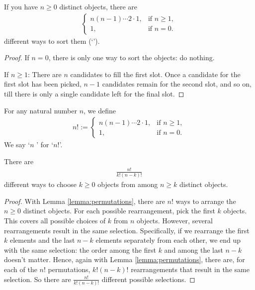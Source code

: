 \label{lemma:permutations}
  If you have $n \geq 0$ distinct objects,
  there are 
  \begin{align*}
    \begin{cases}
      n(n-1)\cdots 2 \cdot 1, & \textrm{if $n \geq 1$}, \\
      1, &\textrm{if $n = 0$.}
    \end{cases}
  \end{align*}
  different ways to sort them (`').
\parend

\begin{proof}
  If $n = 0$, there is only one way to sort the objects: do nothing.

  If $n \geq 1$: There are $n$ candidates to fill the first slot.
  Once a candidate for the first slot has been picked,
  $n-1$ candidates remain for the second slot, and so on,
  till there is only a single candidate left for the final slot.
\end{proof}

  For any natural number $n$, we define
  \begin{align*}
    n! :=     
    \begin{cases}
      n(n-1)\cdots 2 \cdot 1, & \textrm{if $n \geq 1$}, \\
      1, &\textrm{if $n = 0$.}
    \end{cases}
  \end{align*}
  We say `$n$ ' for `$n!$'.
\parend

	There are
  \begin{align*}
    \frac{n!}{k!(n-k)!}
  \end{align*}
  different ways to choose $k \geq 0$ objects from among $n \geq k$
  distinct objects.
\parend

\begin{proof}
  With Lemma \ref{lemma:permutations}, there are $n!$ ways to arrange the $n \geq 0$ distinct objects.
  For each possible rearrangement, pick the first $k$ objects.
  This covers all possible choices of $k$ from $n$ objects.
  However, several rearrangements result in the same selection.
  Specifically, if we rearrange the first $k$ elements and the last $n-k$
  elements separately from each other, we end up with the same selection:
  the order among the first $k$ and among the last $n-k$ doesn't matter.
  Hence, again with Lemma \ref{lemma:permutations}, there are, for each of the $n!$ permutations,
  $k!(n-k)!$ rearrangements that result in the same selection.
  So there are $\frac{n!}{k!(n-k)!}$ different possible selections.
\end{proof}

